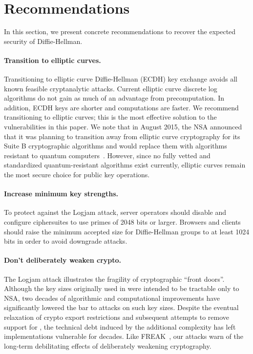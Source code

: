 \section{Recommendations}
\label{sec:lessons}

In this section, we present concrete recommendations to recover the expected
security of Diffie-Hellman.

\paragraph{Transition to elliptic curves.}
Transitioning to elliptic curve Diffie-Hellman (ECDH) key exchange avoids all
known feasible cryptanalytic attacks. Current elliptic curve discrete log
algorithms do not gain as much of an advantage from precomputation. In
addition, ECDH keys are shorter and computations are faster. We recommend
transitioning to elliptic curves; this is the most effective solution to the
vulnerabilities in this paper. We note that in August 2015, the NSA announced
that it was planning to transition away from elliptic curve cryptography for
its Suite B cryptographic algorithms and would replace them with algorithms
resistant to quantum computers~\cite{nsa-suiteb}. However, since no fully
vetted and standardized quantum-resistant algorithms exist currently,
elliptic curves remain the most secure choice for public key operations.

\paragraph{Increase minimum key strengths.}
To protect against the Logjam attack, server operators should disable \dheexp
and configure \dhe ciphersuites to use primes of 2048 bits or larger.
Browsers and clients should raise the minimum accepted size for
Diffie-Hellman groups to at least 1024 bits in order to avoid downgrade
attacks.

\paragraph{Don't deliberately weaken crypto.}
The Logjam attack illustrates the fragility of cryptographic ``front doors''.
Although the key sizes originally used in \dheexp were intended to be
tractable only to NSA, two decades of algorithmic and computational
improvements have significantly lowered the bar to attacks on such key sizes.
Despite the eventual relaxation of crypto export restrictions and subsequent
attempts to remove support for \dheexp{}, the technical debt induced by the
additional complexity has left implementations vulnerable for decades. Like
FREAK~\cite{freak-attack-2015}, our attacks warn of the long-term
debilitating effects of deliberately weakening cryptography.



